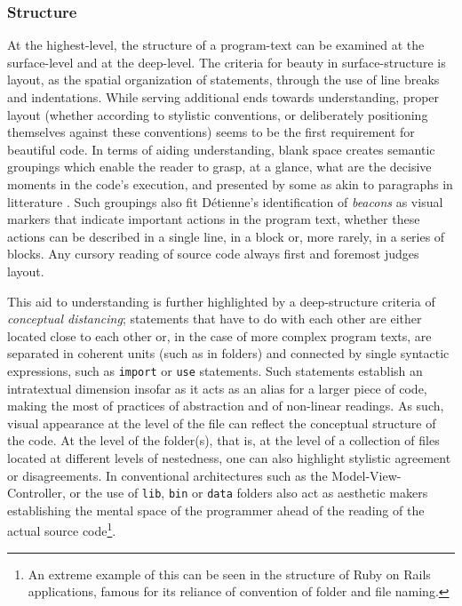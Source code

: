 \subsubsection{Structure}
\label{subsubsec:framework-structure}

At the highest-level, the structure of a program-text can be examined at the surface-level and at the deep-level. The criteria for beauty in surface-structure is layout, as the spatial organization of statements, through the use of line breaks and indentations. While serving additional ends towards understanding, proper layout (whether according to stylistic conventions, or deliberately positioning themselves against these conventions) seems to be the first requirement for beautiful code. In terms of aiding understanding, blank space creates semantic groupings which enable the reader to grasp, at a glance, what are the decisive moments \citep{sennett_craftsman_2009} in the code's execution, and presented by some as akin to paragraphs in litterature \citep{matsumoto_treating_2007}. Such groupings also fit Détienne's identification of \emph{beacons} \citep{detienne_software_2001} as visual markers that indicate important actions in the program text, whether these actions can be described in a single line, in a block or, more rarely, in a series of blocks. Any cursory reading of source code always first and foremost judges layout.

This aid to understanding is further highlighted by a deep-structure criteria of \emph{conceptual distancing}; statements that have to do with each other are either located close to each other or, in the case of more complex program texts, are separated in coherent units (such as in folders) and connected by single syntactic expressions, such as \lstinline{import} or \lstinline{use} statements. Such statements establish an intratextual dimension insofar as it acts as an alias for a larger piece of code, making the most of practices of abstraction and of non-linear readings. As such, visual appearance at the level of the file can reflect the conceptual structure of the code. At the level of the folder(s), that is, at the level of a collection of files located at different levels of nestedness, one can also highlight stylistic agreement or disagreements. In conventional architectures such as the Model-View-Controller, or the use of \lstinline{lib}, \lstinline{bin} or \lstinline{data} folders also act as aesthetic makers establishing the mental space of the programmer ahead of the reading of the actual source code\footnote{An extreme example of this can be seen in the structure of Ruby on Rails applications, famous for its reliance of convention of folder and file naming.}.

